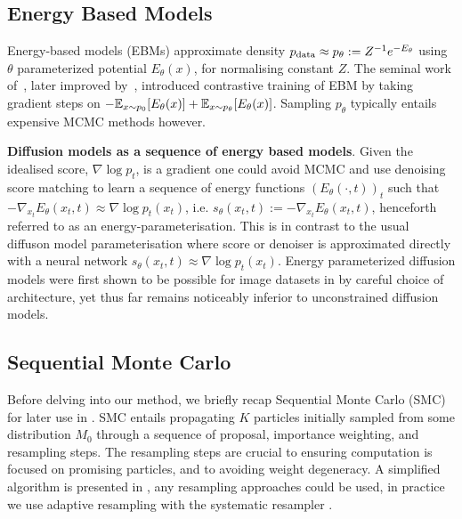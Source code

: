 \subsection{Energy Based Models}\label{sec:ebm}
Energy-based models (EBMs) \citep{lecun2006tutorial} approximate density $p_{\textup{data}} \approx p_\theta:= Z^{-1}e^{-E_\theta}$ using $\theta$ parameterized potential $E_\theta(x)$, for normalising constant $Z$. The seminal work of~\citet{teh2003energy}, later improved by~\citet{du2021improved}, introduced contrastive training of EBM by taking gradient steps on $-\mathbb{E}_{x\sim p_0}[E_{\theta}(x)]+\mathbb{E}_{x\sim p_\theta}[E_{\theta}(x)]$. Sampling $p_\theta$ typically entails expensive MCMC methods however.  

\textbf{Diffusion models as a sequence of energy based models}.
Given the idealised score, $\nabla \log p_t$, is a gradient one could avoid MCMC and use denoising score matching to learn a sequence of energy functions $(E_\theta(\cdot,t))_t$ such that $-\nabla_{x_t} E_\theta(x_t,t) \approx \nabla \log p_t(x_t)$, i.e. $s_\theta(x_t,t):=-\nabla_{x_t} E_\theta(x_t,t)$, henceforth referred to as an energy-parameterisation. This is in contrast to the usual diffuson model parameterisation where score or denoiser is approximated directly with a neural network $s_\theta(x_t,t) \approx \nabla \log p_t(x_t)$. Energy parameterized diffusion models were first shown to be possible for image datasets in \cite{salimans2021should} by careful choice of architecture, yet thus far remains noticeably inferior to unconstrained diffusion models.

\subsection{Sequential Monte Carlo} 
Before delving into our method, we briefly recap Sequential Monte Carlo (SMC)  \citep{doucet2001sequential, chopin2020introduction} for later use in . SMC entails propagating $K$ particles initially sampled from some distribution $M_0$ through a sequence of proposal, importance weighting, and resampling steps. The resampling steps are crucial to ensuring computation is focused on promising particles, and to avoiding weight degeneracy. A simplified algorithm is presented in , any resampling approaches could be used, in practice we use adaptive resampling \citep{del2011adaptive} with the systematic resampler \citep[Chapter 4]{chopin2020introduction}.

